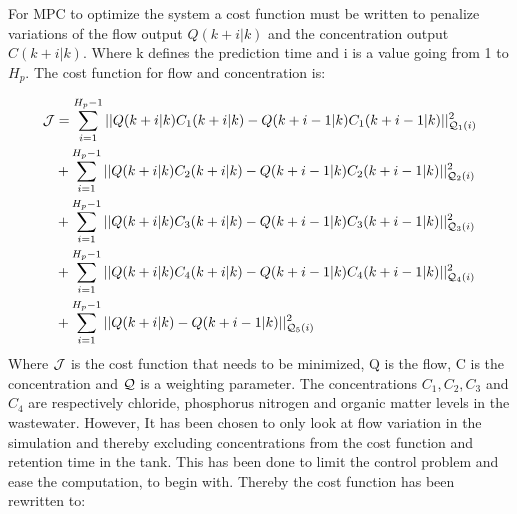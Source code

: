 

For MPC to optimize the system a cost function must be written to penalize variations of the flow output $Q(k+i|k)$ and the concentration output $C(k+i|k)$. Where k defines the prediction time and i is a value going from 1 to $H_p$. The cost function for flow and concentration is:

\begin{equation}
\begin{aligned}
	 \CMcal{J} &= \sum_{i=1}^{H_p-1} || Q(k+i|k)C_1(k+i|k)-Q(k+i-1|k)C_1(k+i-1|k)||_{\CMcal{Q}_1(i)}^2 \\&+\sum_{i=1}^{H_p-1} || Q(k+i|k)C_2(k+i|k)-Q(k+i-1|k)C_2(k+i-1|k)||_{\CMcal{Q}_2(i)}^2 \\&+\sum_{i=1}^{H_p-1} || Q(k+i|k)C_3(k+i|k)-Q(k+i-1|k)C_3(k+i-1|k)||_{\CMcal{Q}_3(i)}^2\\&+\sum_{i=1}^{H_p-1} || Q(k+i|k)C_4(k+i|k)-Q(k+i-1|k)C_4(k+i-1|k)||_{\CMcal{Q}_4(i)}^2 \\& +\sum_{i=1}^{H_p-1} || Q(k+i|k)-Q(k+i-1|k)||_{\CMcal{Q}_5(i)}^2
\end{aligned}	
\end{equation}
Where $\CMcal{J}$ is the cost function that needs to be minimized, Q is the flow, C is the concentration and $\CMcal{Q}$ is a weighting parameter. The concentrations $C_1, C_2, C_3$ and $C_4$ are respectively chloride, phosphorus nitrogen and organic matter levels in the wastewater. However, It has been chosen to only look at flow variation in the simulation and thereby excluding concentrations from the cost function and retention time in the tank. This has been done to limit the control problem and ease the computation, to begin with. Thereby the cost function has been rewritten to: 

